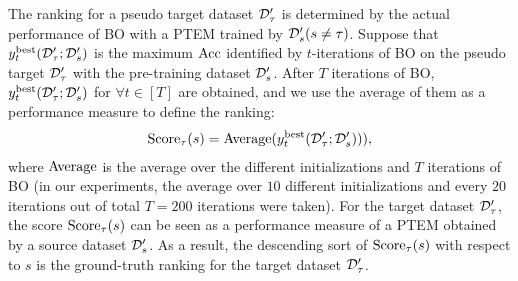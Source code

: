 The ranking for a pseudo target dataset 
${\mathcal D}_\tau^\prime$
is determined by the actual performance of BO with a PTEM trained by 
${\mathcal D}_s^\prime (s \neq \tau)$.
%
Suppose that 
$y^{\rm best}_{t}({\mathcal D}_\tau^\prime ; {\mathcal D}_s^\prime)$
is the maximum 
$\mathrm{Acc}$
identified by $t$-iterations of BO on the pseudo target 
${\mathcal D}_\tau^\prime$
with the pre-training dataset
${\mathcal D}_s^\prime$.
%
After $T$ iterations of BO, 
$y^{\rm best}_t({\mathcal D}_\tau^\prime ; {\mathcal D}_s^\prime)$ 
for 
$\forall t \in [T]$
are obtained, and we use the average of them as a performance measure to define the ranking:
%
\begin{align*}
 \mathrm{Score}_\tau(s) = 
 \mathrm{Average}
 (
 y^{\rm best}_t({\mathcal D}_\tau^\prime ; {\mathcal D}_s^\prime)
 )),
\end{align*}
where
$\mathrm{Average}$ 
is the average over the different initializations and $T$ iterations of BO (in our experiments, the average over $10$ different initializations and every $20$ iterations out of total $T = 200$ iterations were taken).
%
For the target dataset 
${\mathcal D}_\tau^\prime$,
the score 
$\mathrm{Score}_\tau(s)$ 
can be seen as a performance measure of a PTEM obtained by a source dataset 
${\mathcal D}_s^\prime$.
%
%
As a result, the descending sort of 
$\mathrm{Score}_\tau(s)$ 
with respect to $s$ is the ground-truth ranking for the target dataset ${\mathcal D}^\prime_\tau$.


